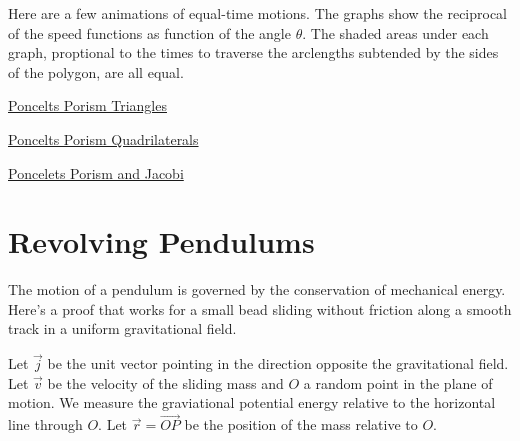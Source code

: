 \documentclass{ximera}
\begin{document}
Here are a few animations of equal-time motions. The graphs show the reciprocal of the speed functions as function of the angle $\theta$. The shaded areas under each graph, proptional to the times to traverse the arclengths subtended by the sides of the polygon, are all equal.

\begin{exploration}

\begin{onlineOnly}
    \begin{center}
\end{center}
\end{onlineOnly}

\href{https://www.desmos.com/calculator/0aihemcv0o}{Poncelts Porism Triangles}

\end{exploration}


\begin{exploration}

\begin{onlineOnly}
    \begin{center}
\end{center}
\end{onlineOnly}

\href{https://www.desmos.com/calculator/pua4ogjcmr}{Poncelts Porism Quadrilaterals}


\end{exploration}


\begin{exploration}
\begin{onlineOnly}
    \begin{center}
\end{center}
\end{onlineOnly}

\href{https://www.desmos.com/calculator/lwbypn9rje}{Poncelets Porism and Jacobi}

\end{exploration}


\section*{Revolving Pendulums}
The motion of a pendulum is governed by the conservation of mechanical energy. Here's a proof that works for a small bead sliding without friction along a smooth track in a uniform gravitational field.

Let $\overrightarrow{j}$ be the unit vector pointing in the direction opposite the gravitational field. Let $\overrightarrow{v}$ be the velocity of the sliding mass and $O$ a random point in the plane of motion. We measure the graviational potential energy relative to the horizontal line through $O$. Let $\overrightarrow{r} = \overrightarrow{OP}$ be the position of the mass relative to $O$.
\end{document}
